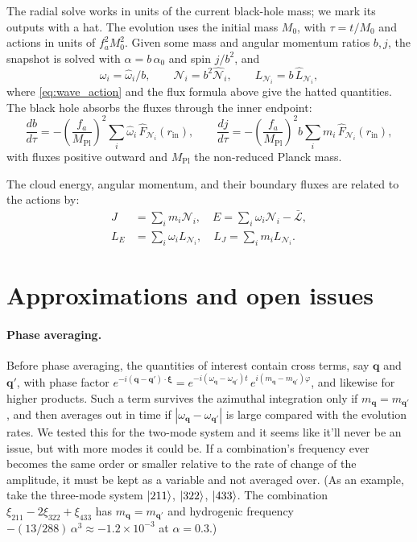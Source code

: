 \documentclass[11pt]{article}
\begin{document}
The radial solve works in units of the current black-hole mass; we mark its outputs with a hat. The evolution uses the initial mass $M_0$, with $\tau=t/M_0$ and actions in units of $f_a^2M_0^2$. Given some mass and angular momentum ratios $b, j$, the snapshot is solved with $\alpha=b\,\alpha_0$ and spin $j/b^2$, and
\begin{equation}
    \label{eq:reference_units}
    \omega_i = \hat\omega_i/b, \qquad
    \mathcal{N}_i = b^2\hat{\mathcal{N}}_i, \qquad
    L_{\mathcal{N}_i} = b\,\hat L_{\mathcal{N}_i},
\end{equation}
where \eqref{eq:wave_action} and the flux formula above give the hatted quantities. The black hole absorbs the fluxes through the inner endpoint:
\begin{equation}
    \label{eq:black_hole_evolution}
    \frac{db}{d\tau} = -\left(\frac{f_a}{M_\mathrm{Pl}}\right)^{2}\sum_i\hat\omega_i\,\hat F_{\mathcal{N}_i}(r_\mathrm{in}),
    \qquad
    \frac{dj}{d\tau} = -\left(\frac{f_a}{M_\mathrm{Pl}}\right)^{2} b\sum_i m_i\,\hat F_{\mathcal{N}_i}(r_\mathrm{in}),
\end{equation}
with fluxes positive outward and $M_\mathrm{Pl}$ the non-reduced Planck mass.

The cloud energy, angular momentum, and their boundary fluxes are related to the actions by:
\begin{align}
    J &= \sum_i m_i\mathcal{N}_i, \quad E = \sum_i\omega_i\mathcal{N}_i-\bar{\mathcal{L}}, \\
    L_E &= \sum_i \omega_i L_{\mathcal{N}_i}, \quad L_J = \sum_i m_i L_{\mathcal{N}_i}.
\end{align}

\section{Approximations and open issues}\label{sec:open_issues}


\paragraph{Phase averaging.} Before phase averaging, the quantities of interest contain cross terms, say $\mathbf{q}$ and $\mathbf{q}'$, with phase factor $e^{-i(\mathbf{q}-\mathbf{q}')\cdot\boldsymbol{\xi}}=e^{-i(\omega_\mathbf{q}-\omega_{\mathbf{q}'})t}\,e^{i(m_\mathbf{q}-m_{\mathbf{q}'})\varphi}$, and likewise for higher products. Such a term survives the azimuthal integration only if $m_\mathbf{q}=m_{\mathbf{q}'}$, and then averages out in time if $|\omega_\mathbf{q}-\omega_{\mathbf{q}'}|$ is large compared with the evolution rates. We tested this for the two-mode system and it seems like it'll never be an issue, but with more modes it could be. If a combination's frequency ever becomes the same order or smaller relative to the rate of change of the amplitude, it must be kept as a variable and not averaged over. (As an example, take the three-mode system $\ket{211}$, $\ket{322}$, $\ket{433}$. The combination $\xi_{211}-2\xi_{322}+\xi_{433}$ has $m_\mathbf{q}=m_{\mathbf{q}'}$ and hydrogenic frequency $-(13/288)\,\alpha^3\approx-1.2\times10^{-3}$ at $\alpha=0.3$.)
\end{document}
